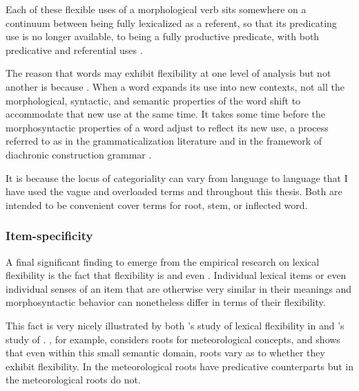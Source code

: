 \noindent Each of these flexible uses of a morphological verb sits somewhere on a continuum between being fully lexicalized as a referent, so that its predicating use is no longer available, to being a fully productive predicate, with both predicative and referential uses \parencite[413]{Mithun2000}.

The reason that words may exhibit flexibility at one level of analysis but not another is because . When a word expands its use into new contexts, not all the morphological, syntactic, and semantic properties of the word shift to accommodate that new use at the same time. It takes some time before the morphosyntactic properties of a word adjust to reflect its new use, a process referred to as  in the grammaticalization literature \parencite{DeSmet2012} and  in the framework of diachronic construction grammar \parencite[27]{HopperTraugott2003}.

It is because the locus of categoriality can vary from language to language that I have used the vague and overloaded terms  and  throughout this thesis. Both are intended to be convenient cover terms for root, stem, or inflected word.

\subsubsection{Item-specificity}
\label{sec:2.3.2.4}

A final significant finding to emerge from the empirical research on lexical flexibility is the fact that flexibility is  and even . Individual lexical items or even individual senses of an item that are otherwise very similar in their meanings and morphosyntactic behavior can nonetheless differ in terms of their flexibility.

This fact is very nicely illustrated by both \citeauthor{Mithun2017}'s study of lexical flexibility in  and \citeauthor{Creissels2017}'s study of . \textcite[163--164]{Mithun2017}, for example, considers roots for meteorological concepts, and shows that even within this small semantic domain, roots vary as to whether they exhibit flexibility. In  the meteorological roots have predicative counterparts but in  the meteorological roots do not.

